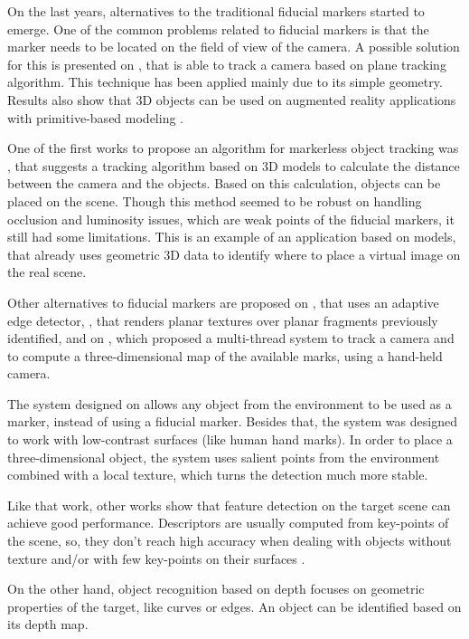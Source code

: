 \documentclass[msc, a4paper, classic, en]{ufbathesis}
\begin{document}
On the last years, alternatives to the traditional fiducial markers started to emerge. One of the common problems related to fiducial markers is that the marker needs to be located on the field of view of the camera. A possible solution for this is presented on \cite{5739718}, that is able to track a camera based on plane tracking algorithm. This technique has been applied mainly due to its simple geometry. Results also show that 3D objects can be used on augmented reality applications with primitive-based modeling \cite{KimLW10}.

One of the first works to propose an algorithm for markerless object tracking was \cite{Comport03d}, that suggests a tracking algorithm based on 3D models to calculate the distance between the camera and the objects. Based on this calculation, objects can be placed on the scene. Though this method seemed to be robust on handling occlusion and luminosity issues, which are weak points of the fiducial markers, it still had some limitations. This is an example of an application based on models, that already uses geometric 3D data to identify where to place a virtual image on the real scene.

Other alternatives to fiducial markers are proposed on \cite{wuest}, that uses an adaptive edge detector, \cite{ferrari}, that renders planar textures over planar fragments previously identified, and on \cite{klein}, which proposed a multi-thread system to track a camera and to compute a three-dimensional map of the available marks, using a hand-held camera.

The system designed on \cite{ZhangL12} allows any object from the environment to be used as a marker, instead of using a fiducial marker. Besides that, the system was designed to work with low-contrast surfaces (like human hand marks). In order to place a three-dimensional object, the system uses salient points from the environment combined with a local texture, which turns the detection much more stable.

Like that work, other works show that feature detection on the target scene can achieve good performance. Descriptors are usually computed from key-points of the scene, so, they don't reach high accuracy when dealing with objects without texture and/or with few key-points on their surfaces \cite{bay}.

On the other hand, object recognition based on depth focuses on geometric properties of the target, like curves or edges. An object can be identified based on its depth map.
\end{document}
